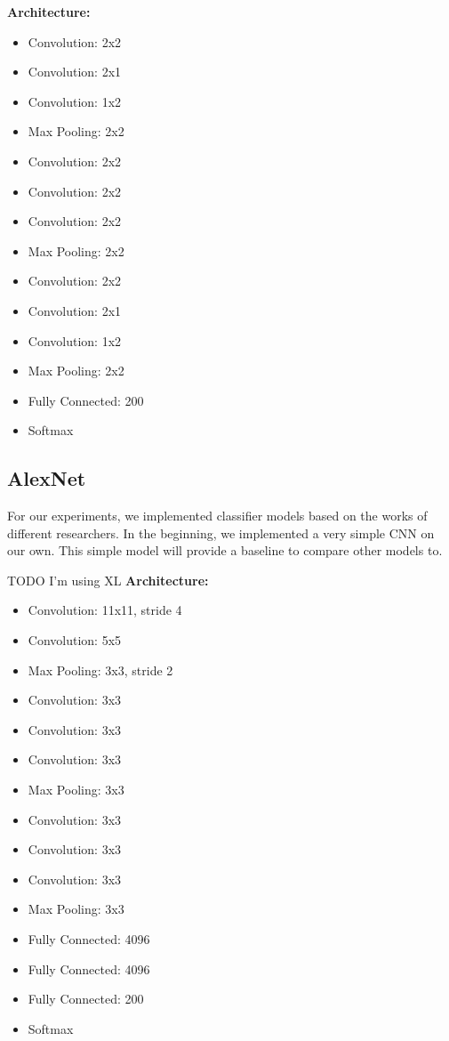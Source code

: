 \documentclass[10pt]{article} %
\begin{document}
\begin{tcolorbox}
	\textbf{Architecture:}
	\begin{itemize}
		\setlength\itemsep{-0.3em}
		\item Convolution: 2x2
		\item Convolution: 2x1
		\item Convolution: 1x2
		\item Max Pooling: 2x2
		\item Convolution: 2x2
		\item Convolution: 2x2
		\item Convolution: 2x2
		\item Max Pooling: 2x2
		\item Convolution: 2x2
		\item Convolution: 2x1
		\item Convolution: 1x2
		\item Max Pooling: 2x2
		\item Fully Connected: 200
		\item Softmax
	\end{itemize}
\end{tcolorbox}

\subsection{AlexNet}

For our experiments, we implemented classifier models based on the works of different researchers. In the beginning, we implemented a very simple CNN on our own. This simple model will provide a baseline to compare other models to.

\begin{tcolorbox}
	TODO I'm using XL
	\textbf{Architecture:}
	\begin{itemize}
		\setlength\itemsep{-0.3em}
		\item Convolution: 11x11, stride 4
		\item Convolution: 5x5
		\item Max Pooling: 3x3, stride 2
		\item Convolution: 3x3
		\item Convolution: 3x3
		\item Convolution: 3x3
		\item Max Pooling: 3x3
		\item Convolution: 3x3
		\item Convolution: 3x3
		\item Convolution: 3x3
		\item Max Pooling: 3x3
		\item Fully Connected: 4096
		\item Fully Connected: 4096
		\item Fully Connected: 200
		\item Softmax
	\end{itemize}
\end{tcolorbox}
\end{document}
